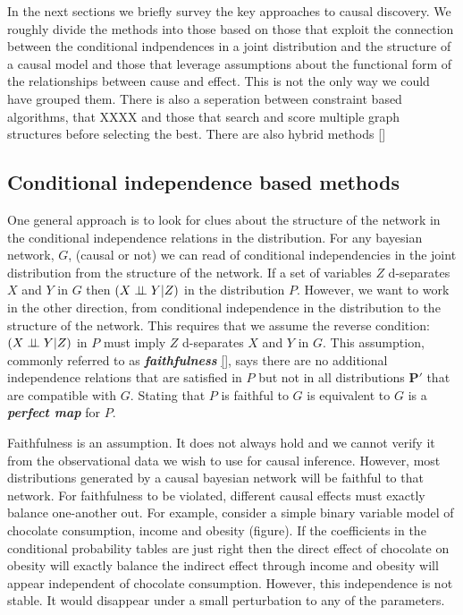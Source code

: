 \documentclass[11pt,a4paper,oneside]{book}
\begin{document}
In the next sections we briefly survey the key approaches to causal discovery. We roughly divide the methods into those based on those that exploit the connection between the conditional indpendences in a joint distribution and the structure of a causal model and those that leverage assumptions about the functional form of the relationships between cause and effect. This is not the only way we could have grouped them. There is also a seperation between constraint based algorithms, that XXXX and those that search and score multiple graph structures before selecting the best. There are also hybrid methods \ref{}  

\subsection*{Conditional independence based methods}
One general approach is to look for clues about the structure of the network in the conditional independence relations in the distribution. For any bayesian network, $G$, (causal or not) we can read of conditional independencies in the joint distribution from the structure of the network. If a set of variables $Z$ d-separates $X$ and $Y$ in $G$ then $(X \perp\!\!\!\perp Y|Z)$ in the distribution $P$. However, we want to work in the other direction, from conditional independence in the distribution to the structure of the network. This requires that we assume the reverse condition: $(X \perp\!\!\!\perp Y|Z)$ in $P$ must imply $Z$ d-separates $X$ and $Y$ in $G$. This assumption, commonly referred to as  \textbf{\textit{faithfulness}} \ref{}, says there are no additional independence relations that are satisfied in $P$ but not in all distributions $\boldsymbol{P'}$ that are compatible with $G$. Stating that $P$ is faithful to $G$ is equivalent to $G$ is a \textbf{\textit{perfect map}} \cite{Kollner} for $P$.

Faithfulness is an assumption. It does not always hold and we cannot verify it from the observational data we wish to use for causal inference. However, most distributions generated by a causal bayesian network will be faithful to that network. For faithfulness to be violated, different causal effects must exactly balance one-another out. For example, consider a simple binary variable model of chocolate consumption, income and obesity (figure). If the coefficients in the conditional probability tables are just right then the direct effect of chocolate on obesity will exactly balance the indirect effect through income and obesity will appear independent of chocolate consumption. However, this independence is not stable. It would disappear under a small perturbation to any of the parameters.   
\end{document}
